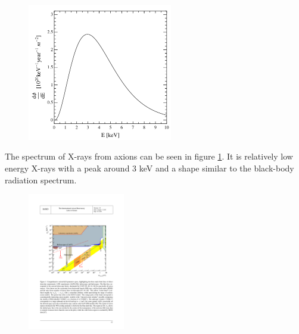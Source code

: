 \begin{figure}[htbp]
  \centering
    \includegraphics[height=6cm]{figures/cast/axion_spectrum.png}
  \caption{}
  \label{fig:axion_spectrum}
\end{figure}

The spectrum of X-rays from axions can be seen in figure \ref{fig:axion_spectrum}. It is relatively low energy X-rays with a peak around 3 keV and a shape similar to the black-body radiation spectrum.

\begin{figure}[htbp]
  \centering
    \includegraphics[height=6cm]{figures/cast/axion_search_cast2.pdf}
  \caption{}
  \label{fig:axion_search_cast}
\end{figure}


